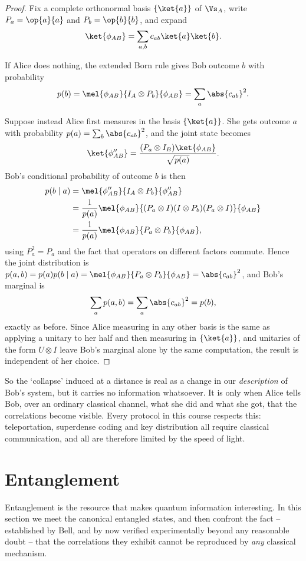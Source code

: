\begin{proof}
	Fix a complete orthonormal basis $\{\ket{a}\}$ of $\Vs_A$, write $P_a = \op{a}{a}$ and $P_b = \op{b}{b}$, and expand
	$$\ket{\phi_{AB}} = \sum_{a,b} c_{ab}\ket{a}\ket{b}.$$

	If Alice does nothing, the extended Born rule gives Bob outcome $b$ with probability
	$$p(b) = \mel{\phi_{AB}}{I_A\otimes P_b}{\phi_{AB}} = \sum_a \abs{c_{ab}}^2.$$

	Suppose instead Alice first measures in the basis $\{\ket{a}\}$. She gets outcome $a$ with probability $p(a) = \sum_b\abs{c_{ab}}^2$, and the joint state becomes
	$$\ket{\phi''_{AB}} = \frac{(P_a\otimes I_B)\ket{\phi_{AB}}}{\sqrt{p(a)}}.$$
	Bob's conditional probability of outcome $b$ is then
	\begin{align*}
		p(b \mid a) &= \mel{\phi''_{AB}}{I_A\otimes P_b}{\phi''_{AB}} \\
		&= \frac{1}{p(a)}\mel{\phi_{AB}}{(P_a\otimes I)(I\otimes P_b)(P_a\otimes I)}{\phi_{AB}} \\
		&= \frac{1}{p(a)}\mel{\phi_{AB}}{P_a\otimes P_b}{\phi_{AB}},
	\end{align*}
	using $P_a^2 = P_a$ and the fact that operators on different factors commute. Hence the joint distribution is $p(a,b) = p(a)p(b\mid a) = \mel{\phi_{AB}}{P_a\otimes P_b}{\phi_{AB}} = \abs{c_{ab}}^2$, and Bob's marginal is
	$$\sum_a p(a,b) = \sum_a \abs{c_{ab}}^2 = p(b),$$
	exactly as before. Since Alice measuring in any other basis is the same as applying a unitary to her half and then measuring in $\{\ket{a}\}$, and unitaries of the form $U \otimes I$ leave Bob's marginal alone by the same computation, the result is independent of her choice.
\end{proof}

So the `collapse' induced at a distance is real as a change in our \emph{description} of Bob's system, but it carries no information whatsoever. It is only when Alice tells Bob, over an ordinary classical channel, what she did and what she got, that the correlations become visible. Every protocol in this course respects this: teleportation, superdense coding and key distribution all require classical communication, and all are therefore limited by the speed of light.

\section{Entanglement}\label{sec:entanglement}

Entanglement is the resource that makes quantum information interesting. In this section we meet the canonical entangled states, and then confront the fact -- established by Bell, and by now verified experimentally beyond any reasonable doubt -- that the correlations they exhibit cannot be reproduced by \emph{any} classical mechanism.


